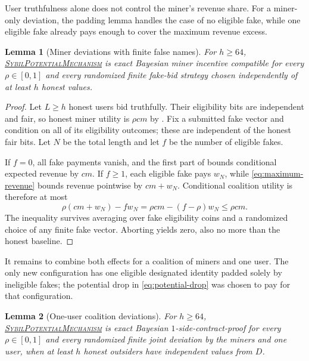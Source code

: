 \documentclass[11pt]{article}
\newtheorem{lemma}{Lemma}[section]
\begin{document}
User truthfulness alone does not control the miner's revenue share.  For a
miner-only deviation, the padding lemma handles the case of no eligible fake,
while one eligible fake already pays enough to cover the maximum revenue
excess.

\begin{lemma}[Miner deviations with finite false names]
\label{lem:large-mic}
For $h\ge64$,
\hyperref[alg:sybil-potential-mechanism]{\textsc{SybilPotentialMechanism}}
is exact Bayesian miner incentive compatible for every $\rho\in[0,1]$ and
every randomized finite fake-bid strategy chosen independently of at least
$h$ honest values.
\end{lemma}

\begin{proof}
Let $L\ge h$ honest users bid truthfully.  Their eligibility bits are
independent and fair, so honest miner utility is $\rho cm$ by
.  Fix a submitted fake vector and condition on all
of its eligibility outcomes; these are independent of the honest fair bits.
Let $N$ be the total length and let $f$ be the number of eligible fakes.

If $f=0$, all fake payments vanish, and the first part of
 bounds conditional expected revenue by $cm$.  If
$f\ge1$, each eligible fake pays $w_N$, while
\eqref{eq:maximum-revenue} bounds revenue pointwise by $cm+w_N$.  Conditional
coalition utility is therefore at most
\[
\rho(cm+w_N)-fw_N
=\rho cm-(f-\rho)w_N
\le\rho cm.
\]
The inequality survives averaging over fake eligibility coins and a randomized
choice of any finite fake vector.  Aborting yields zero, also no more than the
honest baseline.
\end{proof}

It remains to combine both effects for a coalition of miners and one user.
The only new configuration has one eligible designated identity padded solely
by ineligible fakes; the potential drop in \eqref{eq:potential-drop} was chosen
to pay for that configuration.

\begin{lemma}[One-user coalition deviations]
\label{lem:large-scp}
For $h\ge64$,
\hyperref[alg:sybil-potential-mechanism]{\textsc{SybilPotentialMechanism}}
is exact Bayesian $1$-side-contract-proof for every $\rho\in[0,1]$ and every
randomized finite joint deviation by the miners and one user, when at least
$h$ honest outsiders have independent values from $D$.
\end{lemma}
\end{document}
